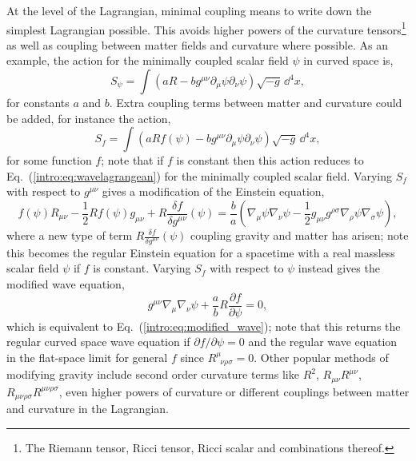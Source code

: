 At the level of the Lagrangian, minimal coupling means to write down the simplest Lagrangian possible. This avoids higher powers of the curvature tensors\footnote{The Riemann tensor, Ricci tensor, Ricci scalar and combinations thereof.} as well as coupling between matter fields and curvature where possible. As an example, the action for the minimally coupled scalar field $\psi$ in curved space is,
\begin{equation}
S_\psi = \int \left( aR - b g^{\mu\nu}\partial_\mu \psi \partial_\nu \psi \right) \sqrt{-g}\,\dd^4 x, \label{intro:eq:wavelagrangean}
\end{equation}
for constants $a$ and $b$. Extra coupling terms between matter and curvature could be added, for instance the action,
\begin{equation}
S_f = \int \left( aRf(\psi) - b g^{\mu\nu}\partial_\mu \psi \partial_\nu \psi \right) \sqrt{-g}\,\dd^4 x,
\end{equation}
for some function $f$; note that if $f$ is constant then this action reduces to Eq.~(\ref{intro:eq:wavelagrangean}) for the minimally coupled scalar field. Varying $S_f$ with respect to $g^{\mu\nu}$ gives a modification of the Einstein equation,
\begin{equation}
f(\psi) R_{\mu\nu} - \frac{1}{2} R f(\psi)g_{\mu\nu} + R \frac{\delta f}{\delta g^{\mu\nu}}(\psi) = \frac{b}{a} \left(\nabla_\mu \psi \nabla_\nu \psi-\frac{1}{2} g_{\mu\nu} g^{\rho\sigma}\nabla_\rho \psi \nabla_\sigma\psi  \right),
\end{equation}
where a new type of term $ R \frac{\delta f}{\delta g^{\mu\nu}}(\psi)$ coupling gravity and matter has arisen; note this becomes the regular Einstein equation for a spacetime with a real massless scalar field $\psi$ if $f$ is constant. Varying $S_f$ with respect to $\psi$ instead gives the modified wave equation,
\begin{equation}
g^{\mu\nu}\nabla_\mu \nabla_\nu \psi + \frac{a}{b}R \frac{\partial f}{\partial \psi} =0,
\end{equation}
which is equivalent to Eq.~(\ref{intro:eq:modified_wave}); note that this returns the regular curved space wave equation if $\partial f / \partial \psi=0$ and the regular wave equation in the flat-space limit for general $f$ since $R^\mu_{\,\,\,\nu\rho\sigma}=0$. Other popular methods of modifying gravity include second order curvature terms like $R^2$, $R_{\mu\nu}R^{\mu\nu}$, $R_{\mu\nu\rho\sigma}R^{\mu\nu\rho\sigma}$, even higher powers of curvature or different couplings between matter and curvature in the Lagrangian.

